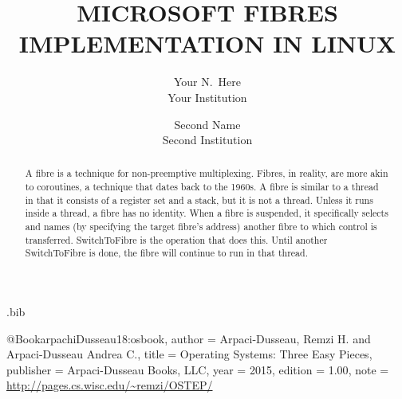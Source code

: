 \usepackage{filecontents}

\begin{filecontents}{\jobname.bib}

@Book{arpachiDusseau18:osbook,
  author =       {Arpaci-Dusseau, Remzi H. and Arpaci-Dusseau Andrea C.},
  title =        {Operating Systems: Three Easy Pieces},
  publisher =    {Arpaci-Dusseau Books, LLC},
  year =         2015,
  edition =      {1.00},
  note =         {\url{http://pages.cs.wisc.edu/~remzi/OSTEP/}}
}

\end{filecontents}



\date{}

\title{\Large \bf MICROSOFT FIBRES IMPLEMENTATION IN LINUX\\}

\author{
{\rm Your N.\ Here}\\
Your Institution
\and
{\rm Second Name}\\
Second Institution
} %

\maketitle

\begin{abstract}
A fibre is a technique for non-preemptive multiplexing. Fibres, in reality, are more akin to coroutines, a technique that dates back to the 1960s. A fibre is similar to a thread in that it consists of a register set and a stack, but it is not a thread. Unless it runs inside a thread, a fibre has no identity. When a fibre is suspended, it specifically selects and names (by specifying the target fibre's address) another fibre to which control is transferred. SwitchToFibre is the operation that does this. Until another SwitchToFibre is done, the fibre will continue to run in that thread.

\end{abstract}


